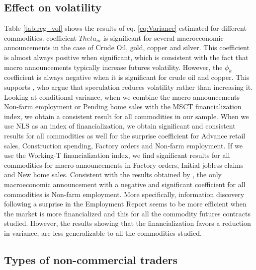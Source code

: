 \documentclass[12pt]{article}
\begin{document}
	\subsection{Effect on volatility}
	Table \ref{tab:reg_vol} shows the results of eq. \eqref{eq:Variance} estimated for different commodities.    coefficient $Theta_m$ is significant for several macroeconomic announcements in the case of Crude Oil, gold, copper and silver. This coefficient is almost always positive when significant, which is consistent with the fact that macro announcements typically increase futures volatility. However, the $\phi_k$ coefficient  is always negative when it is significant for crude oil and copper. This supports \citet{brunetti2016speculators}, who argue that speculation reduces volatility rather than increasing it. Looking at conditional variance, when we combine the macro  announcements Non-farm employment or Pending home sales with the MSCT financialization index, we obtain a consistent result for all commodities in our sample. When we use NLS as an index of financialization, we obtain significant and consistent results for all commodities as well for the surprise coefficient for Advance retail sales, Construction spending, Factory orders and Non-farm employment. If we use the Working-T financialization index, we find significant results for all commodities for macro announcements in Factory orders, Initial jobless claims and New home sales. Consistent with the results obtained by \citet{hordahl2015expectations}, the only macroeconomic announcement with a negative and significant coefficient for all commodities is Non-farm employment. More specifically, information discovery following a surprise in the Employment Report seems to be more efficient when the market is more financialized and this for all the commodity futures contracts studied. However, the results showing that the financialization favors a reduction in variance, are less generalizable to all the commodities studied.

\subsection{Types of non-commercial traders}
\end{document}
